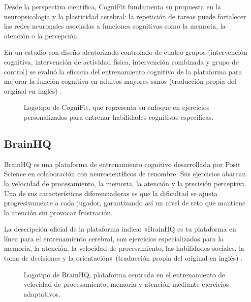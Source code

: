 \documentclass[12pt, a4paper]{report}
\begin{document}
Desde la perspectiva científica, CogniFit fundamenta su propuesta en la
neuropsicología y la plasticidad cerebral: la repetición de tareas puede
fortalecer las redes neuronales asociadas a funciones cognitivas como la
memoria, la atención o la percepción.

En un estudio con diseño aleatorizado controlado de cuatro grupos
(intervención cognitiva, intervención de actividad física, intervención
combinada y grupo de control) se evaluó la eficacia del entrenamiento cognitivo
de la plataforma para mejorar la función cognitiva en adultos mayores sanos
(traducción propia del original en inglés) \citep{CogniFitWeb}.

\begin{figure}[H]
  \centering
  \framebox[6cm]{\parbox[c][3cm]{5.5cm}{\centering\small\textcolor{gray}{[Captura: CogniFit]}}}
  \caption{Logotipo de CogniFit, que representa su enfoque en ejercicios
    personalizados para entrenar habilidades cognitivas específicas.}
  \label{fig:cognifit}
\end{figure}

\subsection{BrainHQ}

BrainHQ es una plataforma de entrenamiento cognitivo desarrollada por Posit
Science en colaboración con neurocientíficos de renombre. Sus ejercicios abarcan
la velocidad de procesamiento, la memoria, la atención y la precisión perceptiva.
Una de sus características diferenciadoras es que la dificultad se ajusta
progresivamente a cada jugador, garantizando así un nivel de reto que mantiene
la atención sin provocar frustración.

La descripción oficial de la plataforma indica: «BrainHQ es tu plataforma en
línea para el entrenamiento cerebral, con ejercicios especializados para la
memoria, la atención, la velocidad de procesamiento, las habilidades sociales,
la toma de decisiones y la orientación» (traducción propia del original en
inglés) \citep{BrainHQWeb}.

\begin{figure}[H]
  \centering
  \framebox[6cm]{\parbox[c][3cm]{5.5cm}{\centering\small\textcolor{gray}{[Captura: BrainHQ]}}}
  \caption{Logotipo de BrainHQ, plataforma centrada en el entrenamiento de
    velocidad de procesamiento, memoria y atención mediante ejercicios adaptativos.}
  \label{fig:brainhq}
\end{figure}
\end{document}
